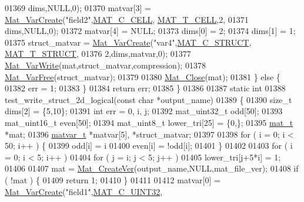 \begin{DoxyCode}
{{{{01369                        dims,NULL,0);
01370         matvar[3] = \hyperlink{group___m_a_t_ga1c54a84bb4d810c6fccdb8869489eac4}{Mat\_VarCreate}(\textcolor{stringliteral}{"field2"},\hyperlink{group___m_a_t_ggad4d60ae7b709fc81bfd744fb4c857c40a2f7abb47a1c51e248bd4e5e03cc81b08}{MAT\_C\_CELL},
      \hyperlink{group___m_a_t_ggacf7b3b879282b7ab3a51190e49bf3453a07599cf2cca6d2b2d059378563318ba5}{MAT\_T\_CELL},2,
01371                        dims,NULL,0);
01372         matvar[4] = NULL;
01373         dims[0] = 2;
01374         dims[1] = 1;
01375         struct\_matvar = \hyperlink{group___m_a_t_ga1c54a84bb4d810c6fccdb8869489eac4}{Mat\_VarCreate}(\textcolor{stringliteral}{"var4"},\hyperlink{group___m_a_t_ggad4d60ae7b709fc81bfd744fb4c857c40acb467c7749c80902b798134c729bb521}{MAT\_C\_STRUCT},
      \hyperlink{group___m_a_t_ggacf7b3b879282b7ab3a51190e49bf3453a4f4d5a6e1d42c6aa81ffb810e5da5c85}{MAT\_T\_STRUCT},
01376                                       2,dims,matvar,0);
01377         \hyperlink{group___m_a_t_ga4bd3eba12df415d8226e27c457fbbb0b}{Mat\_VarWrite}(mat,struct\_matvar,compression);
01378         \hyperlink{group___m_a_t_ga1d14716f7450530fd1c9d02413787f0e}{Mat\_VarFree}(struct\_matvar);
01379 
01380         \hyperlink{group___m_a_t_ga101c92ff7bde4a2d4615661beba09262}{Mat\_Close}(mat);
01381     \} \textcolor{keywordflow}{else} \{
01382         err = 1;
01383     \}
01384     \textcolor{keywordflow}{return} err;
01385 \}
01386 
01387 \textcolor{keyword}{static} \textcolor{keywordtype}{int}
01388 test\_write\_struct\_2d\_logical(\textcolor{keyword}{const} \textcolor{keywordtype}{char} *output\_name)
01389 \{
01390     \textcolor{keywordtype}{size\_t} dims[2] = \{5,10\};
01391     \textcolor{keywordtype}{int}    err = 0, i, j;
01392     mat\_uint32\_t odd[50];
01393     mat\_uint16\_t even[50];
01394     mat\_uint8\_t  lower\_tri[25] = \{0,\};
01395     \hyperlink{struct__mat__t}{mat\_t} *mat;
01396     \hyperlink{group___m_a_t_structmatvar__t}{matvar\_t} *matvar[5], *struct\_matvar;
01397 
01398     \textcolor{keywordflow}{for} ( i = 0; i < 50; i++ ) \{
01399         odd[i] = i %
01400         even[i] = !odd[i];
01401     \}
01402 
01403     \textcolor{keywordflow}{for} ( i = 0; i < 5; i++ )
01404         \textcolor{keywordflow}{for} ( j = i; j < 5; j++ )
01405             lower\_tri[j+5*i] = 1;
01406 
01407     mat = \hyperlink{group___m_a_t_ga22d404f203af7869c841400e7ad247cf}{Mat\_CreateVer}(output\_name,NULL,mat\_file\_ver);
01408     \textcolor{keywordflow}{if} ( !mat ) \{
01409         \textcolor{keywordflow}{return} 1;
01410     \}
01411 
01412     matvar[0] = \hyperlink{group___m_a_t_ga1c54a84bb4d810c6fccdb8869489eac4}{Mat\_VarCreate}(\textcolor{stringliteral}{"field1"},\hyperlink{group___m_a_t_ggad4d60ae7b709fc81bfd744fb4c857c40a9a17a7edd45b19ef68197db81b27e816}{MAT\_C\_UINT32},
}}}}
\end{DoxyCode}
